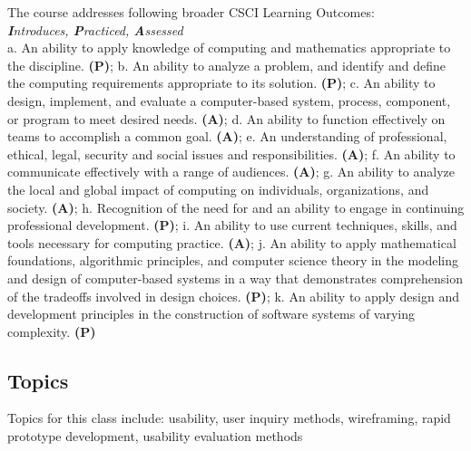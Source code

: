 \documentclass[12pt]{article}
\begin{document}
  The course addresses following broader CSCI Learning Outcomes: \\
  \textit{\textbf{I}ntroduces, \textbf{P}racticed, \textbf{A}ssessed} \\
    a. An ability to apply knowledge of computing and mathematics appropriate to the discipline. \textbf{(P)}; b.  An ability to analyze a problem, and identify and define the computing requirements appropriate to its solution. \textbf{(P)}; c. An ability to design, implement, and evaluate a computer-based system, process, component, or program to meet desired needs. \textbf{(A)}; d. An ability to function effectively on teams to accomplish a common goal. \textbf{(A)}; e. An understanding of professional, ethical, legal, security and social issues and responsibilities. \textbf{(A)}; f. An ability to communicate effectively with a range of audiences. \textbf{(A)}; g. An ability to analyze the local and global impact of computing on individuals, organizations, and society. \textbf{(A)}; h. Recognition of the need for and an ability to engage in continuing professional development. \textbf{(P)}; i. An ability to use current techniques, skills, and tools necessary for computing practice. \textbf{(A)}; j. An ability to apply mathematical foundations, algorithmic principles, and computer science theory in the modeling and design of computer-based systems in a way that demonstrates comprehension of the tradeoffs involved in design choices. \textbf{(P)}; k. An ability to apply design and development principles in the construction of software systems of varying complexity. \textbf{(P)}

  \subsection*{Topics}
  \noindent
  Topics for this class include: usability, user inquiry methods, wireframing, rapid prototype development, usability evaluation methods
  
\end{document}
